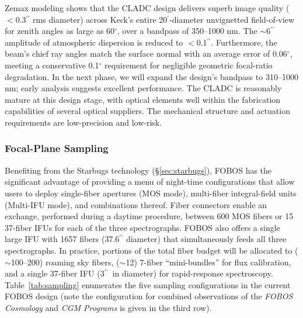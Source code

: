 \documentclass[oneside,11pt]{amsart}
\newcommand{\arcsec}{\mbox{$^{\prime\prime}$}}
\newcommand{\arcmin}{\mbox{$^{\prime}$}}
\begin{document}
Zemax modeling shows that the CLADC design delivers superb image quality ($<$0.3\arcsec{} rms diameter) across Keck's entire 20\arcmin{}-diameter unvignetted field-of-view for zenith angles as large as 60$^\circ$, over a bandpass of 350--1000 nm.  The $\sim$6\arcsec{} amplitude of atmospheric dispersion is reduced to $<$0.1\arcsec{}.  Furthermore, the beam's chief ray angles match the surface normal with an average error of 0.06$^\circ$, meeting a conservative 0.1$^\circ$ requirement for negligible geometric focal-ratio degradation.  In the next phase, we will expand the design's bandpass to 310--1000 nm; early analysis suggests excellent performance.  The CLADC is reasonably mature at this design stage, with optical elements well within the fabrication capabilities of several optical suppliers.  The mechanical structure and actuation requirements are low-precision and low-risk.

\subsubsection{Focal-Plane Sampling}

Benefiting from the Starbugs technology (\S \ref{sec:starbugs}), FOBOS has the significant advantage of providing a menu of night-time configurations that allow users to deploy single-fiber apertures (MOS mode), multi-fiber integral-field units (Multi-IFU mode), and combinations thereof.  Fiber connectors enable an exchange, performed during a daytime procedure, between 600 MOS fibers or 15 37-fiber IFUs for each of the three spectrographs.  FOBOS also offers a single large IFU with 1657 fibers (37.6\arcsec{} diameter)
that simultaneously feeds all three spectrographs. In practice, portions of the total fiber budget will be allocated to ($\sim$100--200) roaming sky fibers, ($\sim$12) 7-fiber ``mini-bundles'' for flux calibration, and a single 37-fiber IFU (3\arcsec\ in diameter) for rapid-response spectroscopy. Table~\ref{tab:sampling} enumerates the five sampling configurations in the current FOBOS design (note the configuration for combined observations of the {\it FOBOS Cosmology} and {\it CGM Programs} is given in the third row).

\end{document}
